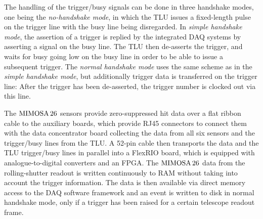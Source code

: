 The handling of the trigger/busy signals can be done in three handshake modes, one being the \textit{no-handshake mode},
 in which the TLU issues a fixed-length pulse on the trigger line with the busy line being disregarded. 
In \textit{simple handshake mode}, the assertion of a trigger is replied by the integrated DAQ systems by asserting a signal on the busy line. 
The TLU then de-asserts the trigger, and waits for busy going low on the busy line in order to be able to issue a subsequent trigger.
The \textit{normal handshake mode} uses the same scheme as in the \textit{simple handshake mode}, but additionally trigger data is transferred on the trigger line:
After the trigger has been de-asserted, the trigger number is clocked out via this line. 


The $\textrm{MIMOSA\,26}$ sensors provide zero-suppressed hit data over a flat ribbon cable to the auxiliary boards, which provide RJ45 connectors to connect them with the
 data concentrator board collecting the data from all six sensors and the trigger/busy lines from the TLU. 
A 52-pin cable then transports the data and the TLU trigger/busy lines in parallel into a FlexRIO board, which is equipped with analogue-to-digital converters and an FPGA. 
The $\textrm{MIMOSA\,26}$ data from the rolling-shutter readout is written continuously to RAM without taking into account the trigger information. 
The data is then available via direct memory access to the DAQ software framework and an event is written to disk in normal handshake mode, only if a trigger has been raised for a certain telescope readout frame. 

